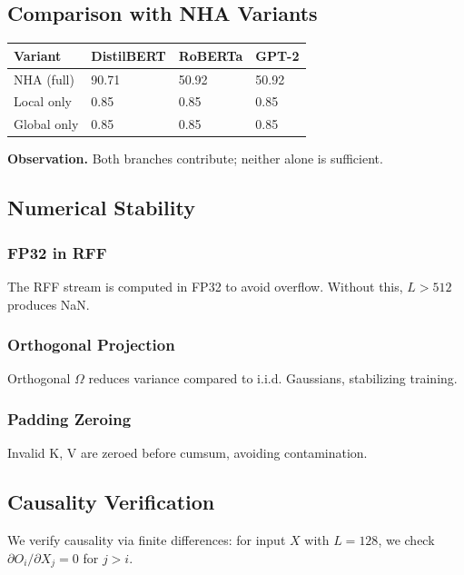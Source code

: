 \subsection{Comparison with NHA Variants}

\begin{table}[H]
\centering
\small
\begin{tabular}{llll}
\toprule
\textbf{Variant} & \textbf{DistilBERT} & \textbf{RoBERTa} & \textbf{GPT-2} \\
\midrule
NHA (full) & 90.71 & 50.92 & 50.92 \\
Local only & 0.85 & 0.85 & 0.85 \\
Global only & 0.85 & 0.85 & 0.85 \\
\bottomrule
\end{tabular}
\end{table}

\textbf{Observation.} Both branches contribute; neither alone is sufficient.

\subsection{Numerical Stability}

\subsubsection{FP32 in RFF}

The RFF stream is computed in FP32 to avoid overflow. Without this, 
$L > 512$ produces NaN.

\subsubsection{Orthogonal Projection}

Orthogonal $\Omega$ reduces variance compared to i.i.d. Gaussians, 
stabilizing training.

\subsubsection{Padding Zeroing}

Invalid K, V are zeroed before cumsum, avoiding contamination.

\subsection{Causality Verification}

We verify causality via finite differences: for input $X$ with $L = 128$, 
we check $\partial O_i / \partial X_j = 0$ for $j > i$.

